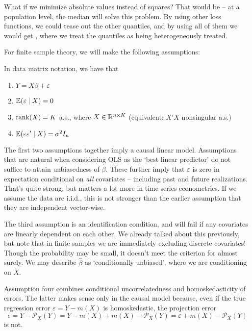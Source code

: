 \documentclass[10pt]{article}
\begin{document}
\begin{remark}
	What if we minimize absolute values instead of squares? That would be  -- at a population level, the median will solve this problem. By using other loss functions, we could tease out the other quantiles, and by using all of them we would get , where we treat the quantiles as being heterogeneously treated.
\end{remark}

For finite sample theory, we will make the following assumptions:

\begin{assumption}\label{ass:ols_finite}
	In data matrix notation, we have that \begin{enumerate}
		\item $Y = X\beta + \varepsilon$ 
		\item $\mathbb{E}(\varepsilon \mid X) = 0$ 
		\item $\mathop{\rm rank}(X) = K$ a.s., where $X \in \mathbb{R}^{n \times K}$  (equivalent: $X'X$ nonsingular a.s.)
		\item $\mathbb{E}(\varepsilon\varepsilon' \mid X) = \sigma^2 I_n$ 
	\end{enumerate}
\end{assumption}
The first two assumptions together imply a causal linear model. Assumptions that are natural when considering OLS as the `best linear predictor' do not suffice to attain unbiasedness of $\hat{\beta}$. These further imply that $\varepsilon$ is zero in expectation conditional on \emph{all} covariates -- including past and future realizations. That's quite strong, but matters a lot more in time series econometrics. If we assume the data are i.i.d., this is not stronger than the earlier assumption that they are independent vector-wise.

The third assumption is an identification condition, and will fail if any covariates are linearly dependent on each other. We already talked about this previously, but note that in finite samples we are immediately excluding discrete covariates! Though the probability may be small, it doesn't meet the criterion for almost surely. We may describe $\hat{\beta}$ as `conditionally unbiased', where we are conditioning on $X$.

Assumption four combines conditional uncorrelatedness and homoskedasticity of errors. The latter makes sense only in the causal model because, even if the true regression error $\varepsilon = Y - m(X)$ is homoskedastic, the projection error \[e = Y - \mathcal{P}_X(Y) = Y - m(X)+ m(X)-\mathcal{P}_X(Y) = \varepsilon + m(X) - \mathcal{P}_X(Y)\]is not.
\end{document}

